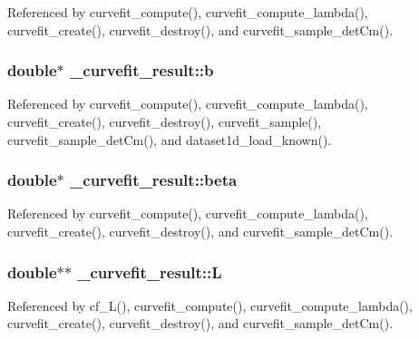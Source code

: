 Referenced by curvefit\+\_\+compute(), curvefit\+\_\+compute\+\_\+lambda(), curvefit\+\_\+create(), curvefit\+\_\+destroy(), and curvefit\+\_\+sample\+\_\+det\+Cm().

\subsubsection[{\texorpdfstring{b}{b}}]{\setlength{\rightskip}{0pt plus 5cm}double$\ast$ \+\_\+curvefit\+\_\+result\+::b}\hypertarget{struct__curvefit__result_a43187b41a4fec805c76ee32325f4942c}{}\label{struct__curvefit__result_a43187b41a4fec805c76ee32325f4942c}


Referenced by curvefit\+\_\+compute(), curvefit\+\_\+compute\+\_\+lambda(), curvefit\+\_\+create(), curvefit\+\_\+destroy(), curvefit\+\_\+sample(), curvefit\+\_\+sample\+\_\+det\+Cm(), and dataset1d\+\_\+load\+\_\+known().

\subsubsection[{\texorpdfstring{beta}{beta}}]{\setlength{\rightskip}{0pt plus 5cm}double$\ast$ \+\_\+curvefit\+\_\+result\+::beta}\hypertarget{struct__curvefit__result_af944a98599d8267f8aea2ece7d392934}{}\label{struct__curvefit__result_af944a98599d8267f8aea2ece7d392934}


Referenced by curvefit\+\_\+compute(), curvefit\+\_\+compute\+\_\+lambda(), curvefit\+\_\+create(), curvefit\+\_\+destroy(), and curvefit\+\_\+sample\+\_\+det\+Cm().

\subsubsection[{\texorpdfstring{L}{L}}]{\setlength{\rightskip}{0pt plus 5cm}double$\ast$$\ast$ \+\_\+curvefit\+\_\+result\+::L}\hypertarget{struct__curvefit__result_a1980f366a2c6b55a90488993ce4ff45f}{}\label{struct__curvefit__result_a1980f366a2c6b55a90488993ce4ff45f}


Referenced by cf\+\_\+\+L(), curvefit\+\_\+compute(), curvefit\+\_\+compute\+\_\+lambda(), curvefit\+\_\+create(), curvefit\+\_\+destroy(), and curvefit\+\_\+sample\+\_\+det\+Cm().

